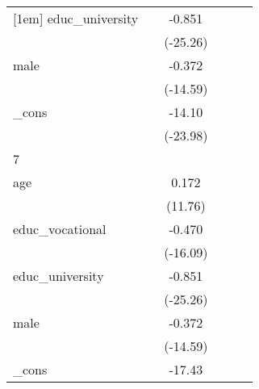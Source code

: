 {\begin{tabular}{l*{5}{c}}
[1em]
educ\_university&                     &      -0.851\sym{***}&                     &                     &                     \\
            &                     &    (-25.26)         &                     &                     &                     \\
[1em]
male        &                     &      -0.372\sym{***}&                     &                     &                     \\
            &                     &    (-14.59)         &                     &                     &                     \\
[1em]
\_cons      &                     &      -14.10\sym{***}&                     &                     &                     \\
            &                     &    (-23.98)         &                     &                     &                     \\
\hline
7           &                     &                     &                     &                     &                     \\
age         &                     &       0.172\sym{***}&                     &                     &                     \\
            &                     &     (11.76)         &                     &                     &                     \\
[1em]
educ\_vocational&                     &      -0.470\sym{***}&                     &                     &                     \\
            &                     &    (-16.09)         &                     &                     &                     \\
[1em]
educ\_university&                     &      -0.851\sym{***}&                     &                     &                     \\
            &                     &    (-25.26)         &                     &                     &                     \\
[1em]
male        &                     &      -0.372\sym{***}&                     &                     &                     \\
            &                     &    (-14.59)         &                     &                     &                     \\
[1em]
\_cons      &                     &      -17.43\sym{***}&                     &                     &                     \\

\end{tabular}}
